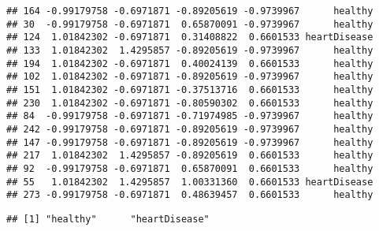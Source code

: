 \documentclass[
]{article}
\newenvironment{Shaded}{\begin{snugshade}}{\end{snugshade}}
\newcommand{\AttributeTok}[1]{\textcolor[rgb]{0.77,0.63,0.00}{#1}}
\newcommand{\DecValTok}[1]{\textcolor[rgb]{0.00,0.00,0.81}{#1}}
\newcommand{\FunctionTok}[1]{\textcolor[rgb]{0.00,0.00,0.00}{#1}}
\newcommand{\NormalTok}[1]{#1}
\newcommand{\OtherTok}[1]{\textcolor[rgb]{0.56,0.35,0.01}{#1}}
\newcommand{\SpecialCharTok}[1]{\textcolor[rgb]{0.00,0.00,0.00}{#1}}
\newcommand{\StringTok}[1]{\textcolor[rgb]{0.31,0.60,0.02}{#1}}
\begin{document}
\begin{verbatim}
## 164 -0.99179758 -0.6971871 -0.89205619 -0.9739967      healthy
## 30  -0.99179758 -0.6971871  0.65870091 -0.9739967      healthy
## 124  1.01842302 -0.6971871  0.31408822  0.6601533 heartDisease
## 133  1.01842302  1.4295857 -0.89205619 -0.9739967      healthy
## 194  1.01842302 -0.6971871  0.40024139  0.6601533      healthy
## 102  1.01842302 -0.6971871 -0.89205619 -0.9739967      healthy
## 151  1.01842302 -0.6971871 -0.37513716  0.6601533      healthy
## 230  1.01842302 -0.6971871 -0.80590302  0.6601533      healthy
## 84  -0.99179758 -0.6971871 -0.71974985 -0.9739967      healthy
## 242 -0.99179758 -0.6971871 -0.89205619 -0.9739967      healthy
## 147 -0.99179758 -0.6971871 -0.89205619 -0.9739967      healthy
## 217  1.01842302  1.4295857 -0.89205619  0.6601533      healthy
## 92  -0.99179758 -0.6971871  0.65870091  0.6601533      healthy
## 55   1.01842302  1.4295857  1.00331360  0.6601533 heartDisease
## 273 -0.99179758 -0.6971871  0.48639457  0.6601533      healthy
\end{verbatim}

\begin{Shaded}
\end{Shaded}

\begin{verbatim}
## [1] "healthy"      "heartDisease"
\end{verbatim}

\begin{Shaded}
\end{Shaded}
\end{document}
